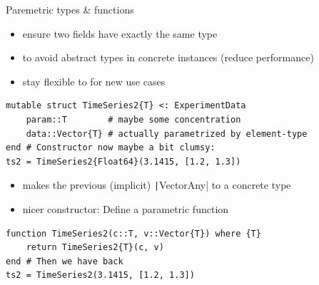 \documentclass[aspectratio=169, 12pt]{beamer}
\begin{document}
    \begin{frame}[fragile]{Paremetric types \& functions}
        \begin{itemize}[<+->]
            \item ensure two fields have \alert{exactly the same type}
            \item to avoid abstract types in concrete instances (reduce performance)
            \item stay flexible to for new use cases
        \end{itemize}
        \pause
        \begin{verbatim}
mutable struct TimeSeries2{T} <: ExperimentData
    param::T        # maybe some concentration
    data::Vector{T} # actually parametrized by element-type
end # Constructor now maybe a bit clumsy:
ts2 = TimeSeries2{Float64}(3.1415, [1.2, 1.3])
        \end{verbatim}
        \pause
        \begin{itemize}
            \item makes the previous (implicit) \texttt|Vector{Any}| to a concrete type
            \pause
            \item nicer constructor: Define a \alert{parametric function}
        \end{itemize}
        \begin{verbatim}
function TimeSeries2(c::T, v::Vector{T}) where {T}
    return TimeSeries2{T}(c, v)
end # Then we have back
ts2 = TimeSeries2(3.1415, [1.2, 1.3])
        \end{verbatim}
    \end{frame}
\end{document}
